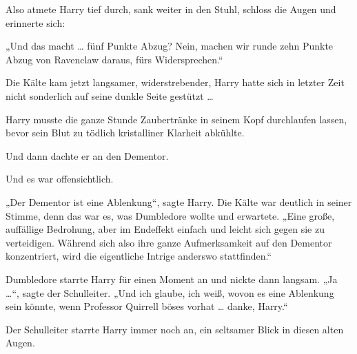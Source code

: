Also atmete Harry tief durch, sank weiter in den Stuhl, schloss die Augen und erinnerte sich:

„Und das macht … fünf Punkte Abzug? Nein, machen wir runde zehn Punkte Abzug von Ravenclaw daraus, fürs Widersprechen.“

Die Kälte kam jetzt langsamer, widerstrebender, Harry hatte sich in letzter Zeit nicht sonderlich auf seine dunkle Seite gestützt …

Harry musste die ganze Stunde Zaubertränke in seinem Kopf durchlaufen lassen, bevor sein Blut zu tödlich kristalliner Klarheit abkühlte.

Und dann dachte er an den Dementor.

Und es war offensichtlich.

„Der Dementor ist eine Ablenkung“, sagte Harry. Die Kälte war deutlich in seiner Stimme, denn das war es, was Dumbledore wollte und erwartete.
„Eine große, auffällige Bedrohung, aber im Endeffekt einfach und leicht sich gegen sie zu verteidigen. Während sich also ihre ganze Aufmerksamkeit auf den Dementor konzentriert, wird die eigentliche Intrige anderswo stattfinden.“

Dumbledore starrte Harry für einen Moment an und nickte dann langsam.
„Ja …“, sagte der Schulleiter.
„Und ich glaube, ich weiß, wovon es eine Ablenkung sein könnte, wenn Professor Quirrell böses vorhat … danke, Harry.“

Der Schulleiter starrte Harry immer noch an, ein seltsamer Blick in diesen alten Augen.

